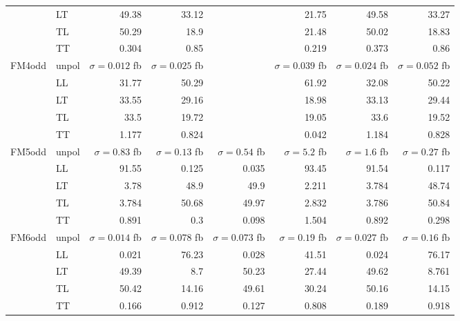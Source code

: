 \begin{table}[h]
{\begin{tabular}{llrrrrrr}
 & LT & \num{49.38} & \num{33.12} &  & \num{21.75} & \num{49.58} & \num{33.27} \\
 & TL & \num{50.29} & \num{18.9} &  & \num{21.48} & \num{50.02} & \num{18.83} \\
 & TT & \num{0.304} & \num{0.85} &  & \num{0.219} & \num{0.373} & \num{0.86} \\
\midrule
\multirow{5}{*}{FM4odd}
 & unpol & $\sigma = \num{0.012}$ fb & $\sigma = \num{0.025}$ fb &  & $\sigma = \num{0.039}$ fb & $\sigma = \num{0.024}$ fb & $\sigma = \num{0.052}$ fb \\
 & LL & \num{31.77} & \num{50.29} &  & \num{61.92} & \num{32.08} & \num{50.22} \\
 & LT & \num{33.55} & \num{29.16} &  & \num{18.98} & \num{33.13} & \num{29.44} \\
 & TL & \num{33.5} & \num{19.72} &  & \num{19.05} & \num{33.6} & \num{19.52} \\
 & TT & \num{1.177} & \num{0.824} &  & \num{0.042} & \num{1.184} & \num{0.828} \\
\midrule
\multirow{5}{*}{FM5odd}
 & unpol & $\sigma = \num{0.83}$ fb & $\sigma = \num{0.13}$ fb & $\sigma = \num{0.54}$ fb & $\sigma = \num{5.2}$ fb & $\sigma = \num{1.6}$ fb & $\sigma = \num{0.27}$ fb \\
 & LL & \num{91.55} & \num{0.125} & \num{0.035} & \num{93.45} & \num{91.54} & \num{0.117} \\
 & LT & \num{3.78} & \num{48.9} & \num{49.9} & \num{2.211} & \num{3.784} & \num{48.74} \\
 & TL & \num{3.784} & \num{50.68} & \num{49.97} & \num{2.832} & \num{3.786} & \num{50.84} \\
 & TT & \num{0.891} & \num{0.3} & \num{0.098} & \num{1.504} & \num{0.892} & \num{0.298} \\
\midrule
\multirow{5}{*}{FM6odd}
 & unpol & $\sigma = \num{0.014}$ fb & $\sigma = \num{0.078}$ fb & $\sigma = \num{0.073}$ fb & $\sigma = \num{0.19}$ fb & $\sigma = \num{0.027}$ fb & $\sigma = \num{0.16}$ fb \\
 & LL & \num{0.021} & \num{76.23} & \num{0.028} & \num{41.51} & \num{0.024} & \num{76.17} \\
 & LT & \num{49.39} & \num{8.7} & \num{50.23} & \num{27.44} & \num{49.62} & \num{8.761} \\
 & TL & \num{50.42} & \num{14.16} & \num{49.61} & \num{30.24} & \num{50.16} & \num{14.15} \\
 & TT & \num{0.166} & \num{0.912} & \num{0.127} & \num{0.808} & \num{0.189} & \num{0.918} \\
\bottomrule
\end{tabular}
}%
\end{table}